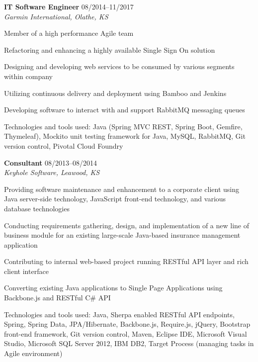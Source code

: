 \begin{itemize1}
	\item \textbf{IT Software Engineer} \textopenbullet{} 08/2014--11/2017 \\
		\textit{Garmin International, Olathe, KS} \vspace{-1.5mm}
		\begin{itemize1}
			\item Member of a high performance Agile team
			\item Refactoring and enhancing a highly available Single Sign On solution
			\item Designing and developing web services to be consumed by various segments within company
			\item Utilizing continuous delivery and deployment using Bamboo and Jenkins
			\item Developing software to interact with and support RabbitMQ messaging queues 
			\item Technologies and tools used: Java (Spring MVC REST, Spring Boot, Gemfire, Thymeleaf), Mockito unit testing framework for Java, MySQL, RabbitMQ, Git version control, Pivotal Cloud Foundry
		\end{itemize1}
\end{itemize1}

\begin{itemize1}
	\item \textbf{Consultant} \textopenbullet{} 08/2013--08/2014 \\
		\textit{Keyhole Software, Leawood, KS} \vspace{-1.5mm}
		\begin{itemize1}
			\item Providing software maintenance and enhancement to a corporate client using Java server-side technology, JavaScript front-end technology, and various database technologies
			\item Conducting requirements gathering, design, and implementation of a new line of business module for an existing large-scale Java-based insurance management application
			\item Contributing to internal web-based project running RESTful API layer and rich client interface
			\item Converting existing Java applications to Single Page Applications using Backbone.js and RESTful C\# API
			\item Technologies and tools used: Java, Sherpa enabled RESTful API endpoints, Spring, Spring Data, JPA/Hibernate, Backbone.js, Require.js, jQuery, Bootstrap front-end framework, Git version control, Maven, Eclipse IDE, Microsoft Visual Studio, Microsoft SQL Server 2012, IBM DB2, Target Process (managing tasks in Agile environment)
		\end{itemize1}
\end{itemize1}

